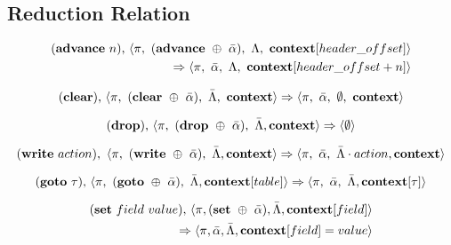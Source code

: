 \subsection{Reduction Relation}
\setlength{\mathindent}{0pt}
\begin{equation}
\begin{split}
  (\textbf{\textrm{advance}} \ n)\textrm{,} \ \langle \pi, \ (\textrm{\textbf{advance}} \ \oplus \ \bar \alpha), \ \Lambda,
  \ \textrm{\textbf{context}}[header\_offset] \rangle \\ \Rightarrow \langle \pi, \ \bar \alpha, \ \Lambda,
  \ \textrm{\textbf{context}}[header\_offset + n] \rangle
\end{split}
\end{equation}

\begin{equation}
  (\textrm{\textbf{clear}}) \textrm{,} \ \langle \pi, \ (\textbf{\textrm{clear}} \ \oplus \ \bar \alpha), \ \bar \Lambda, \ \textrm{\textbf{context}} \rangle
  \Rightarrow \langle \pi, \ \bar \alpha, \ \emptyset, \  \textrm{\textbf{context}} \rangle
\end{equation}

\begin{equation}  
  (\textrm{\textbf{drop})} \textrm{,} \ \langle \pi, \ (\textrm{\textbf{drop}} \ \oplus \ \bar \alpha), \ \bar \Lambda, \textbf{\textrm{context}} \rangle
  \Rightarrow \langle \emptyset \rangle
\end{equation}

\begin{equation}
  (\textrm{\textbf{write}} \ action), \ \langle \pi, \ (\textrm{\textbf{write}} \ \oplus \ \bar \alpha), \ \bar \Lambda,
  \textrm{\textbf{context}} \rangle \Rightarrow
  \langle \pi, \ \bar \alpha, \ \bar \Lambda \cdot action, \textrm{\textbf{context}} \rangle
\end{equation}

\begin{equation}
  (\textrm{\textbf{goto}} \ \tau) \textrm{,} \ \langle \pi, \ (\textrm{\textbf{goto}} \ \oplus \ \bar \alpha), \ \bar \Lambda, \textrm{\textbf{context}}[table] \rangle
  \Rightarrow \langle \pi, \ \bar \alpha, \ \bar \Lambda, \textrm{\textbf{context}}[\tau] \rangle
\end{equation}

\begin{equation}
\begin{split}
  (\textrm{\textbf{set}} \ field \ value) \textrm{,} \ \langle \pi, (\textrm{\textbf{set}} \ \oplus \ \bar \alpha), \bar \Lambda,
  \textbf{\textrm{context}}[field] \rangle \\
  \Rightarrow \langle \pi, \bar \alpha, \bar \Lambda,
  \textbf{\textrm{context}}[field] = value \rangle
\end{split}
\end{equation}

